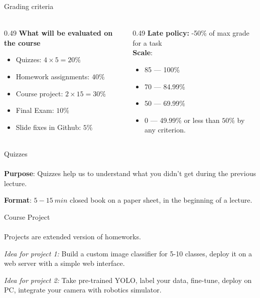 \documentclass[aspectratio=169]{beamer}
\begin{document}
\begin{frame}[t]{Grading criteria}
    \framesubtitle{}
    \begin{columns}[T,onlytextwidth]
        \begin{column}{0.49\textwidth}
            \textbf{What will be evaluated on the course}
            \begin{itemize}
                \item[Qz:] Quizzes: $4\times 5=20\%$ 
                \item[HWs:] Homework assignments: $40\%$
                \item[CP:] Course project: $2\times 15=30\%$
                \item[FE:] Final Exam: $10\%$
                \item[Extra:] Slide fixes in Github: $5\%$ 
            \end{itemize}
        \end{column}
        \begin{column}{0.49\textwidth}
            \textbf{Late policy:} -50\% of max grade for a task \\
            \textbf{Scale}:
            \begin{itemize}
                \item[5:] 85 --- 100\%
                \item[4:] 70 --- 84.99\%
                \item[3:] 50 --- 69.99\%
                \item[2:] 0 --- 49.99\% or less than $50\%$ by any criterion. 
            \end{itemize}
        \end{column}
    \end{columns}
\end{frame}

\begin{frame}[t]{Quizzes}
    \framesubtitle{}
        \textbf{Purpose}: Quizzes help us to understand what you didn't get during the previous lecture.
        \bigskip

    \textbf{Format}: $5-15\ min$ closed book on a paper sheet, in the beginning of a lecture. \\
    \end{frame}

\begin{frame}[t]{Course Project}
    \framesubtitle{}
    Projects are extended version of homeworks.

    \textit{Idea for project 1:} Build a custom image classifier for 5-10 classes, deploy it on a web server with a simple web interface.
    \medskip

    \textit{Idea for project 2:} Take pre-trained YOLO, label your data, fine-tune, deploy on PC, integrate your camera with robotics simulator.
\end{frame}
\end{document}

